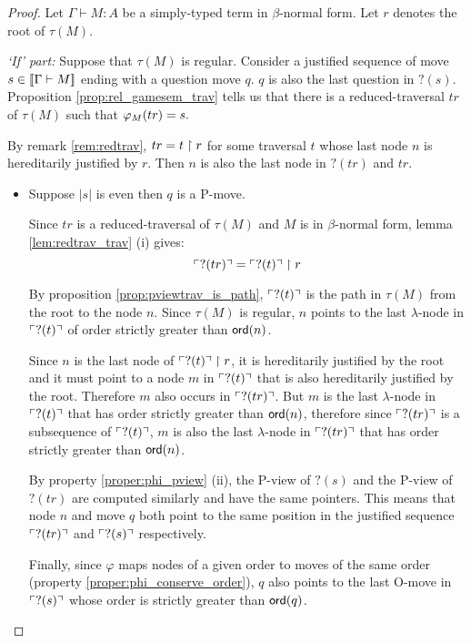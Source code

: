 \begin{proof}
Let $\Gamma \vdash M : A$ be a simply-typed term in $\beta$-normal form.
Let $r$ denotes the root of $\tau(M)$.

\noindent \emph{`If' part:} Suppose that $\tau(M)$ is regular.
Consider a justified sequence of move $s \in {[\![\Gamma \vdash M ]\!]}$
ending with a question move $q$. $q$ is also the last question in $?(s)$.
Proposition \ref{prop:rel_gamesem_trav} tells us that there
is a reduced-traversal $tr$ of $\tau(M)$ such that $\varphi_{M}(tr) = s.$

By remark \ref{rem:redtrav}, $ tr = t \upharpoonright r$
for some traversal $t$ whose last node $n$ is hereditarily justified by $r$. Then $n$ is also the last node in $?(tr)$ and $tr$.

\begin{itemize}
\item Suppose $|s|$ is even then $q$ is a P-move.

Since $tr$ is a reduced-traversal of $\tau(M)$ and $M$ is in $\beta$-normal form, lemma \ref{lem:redtrav_trav} (i) gives:
\begin{equation*}
 \ulcorner ?(tr) \urcorner = \ulcorner ?(t) \urcorner \upharpoonright  r
\end{equation*}

By proposition \ref{prop:pviewtrav_is_path}, $\ulcorner ?(t) \urcorner$ is
the path in $\tau(M)$ from the root to the node $n$.
Since $\tau(M)$ is regular, $n$ points to the
last $\lambda$-node in $\ulcorner ?(t) \urcorner$ of order strictly greater than ${\sf ord}(n)$.

Since $n$ is the last node of $\ulcorner ?(t) \urcorner \upharpoonright r$,
it is hereditarily justified by the root and it must point to a node
$m$ in $\ulcorner ?(t) \urcorner$ that is also hereditarily justified by the
root. Therefore $m$ also occurs in $\ulcorner ?(tr) \urcorner$. But $m$ is the
last $\lambda$-node in $\ulcorner ?(t) \urcorner$ that has order strictly
greater than ${\sf ord}(n)$, therefore since $\ulcorner ?(tr) \urcorner$ is a
subsequence of $\ulcorner ?(t) \urcorner$, $m$ is also the last $\lambda$-node
in $\ulcorner ?(tr) \urcorner$ that has order strictly greater than
${\sf ord}(n)$.


By property \ref{proper:phi_pview} (ii), the P-view of $?(s)$ and the P-view of $?(tr)$ are computed
similarly and have the same pointers. This means that
node $n$ and  move $q$ both point to the same position in
the justified sequence $\ulcorner ?(tr) \urcorner$ and $\ulcorner ?(s) \urcorner$ respectively.

Finally, since $\varphi$ maps nodes of a given order to moves of the same order (property \ref{proper:phi_conserve_order}),
$q$ also points to the last O-move in $\ulcorner ?(s) \urcorner$ whose
order is strictly greater than ${\sf ord}(q)$.


\end{itemize}
\end{proof}
